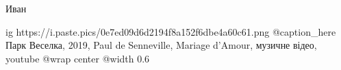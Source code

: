 Иван

\ifcmt
  ig https://i.paste.pics/0e7ed09d6d2194f8a152f6dbe4a60c61.png
  @caption_here Парк Веселка, 2019, Paul de Senneville, Mariage d'Amour, музичне відео, youtube
  @wrap center
  @width 0.6
\fi




